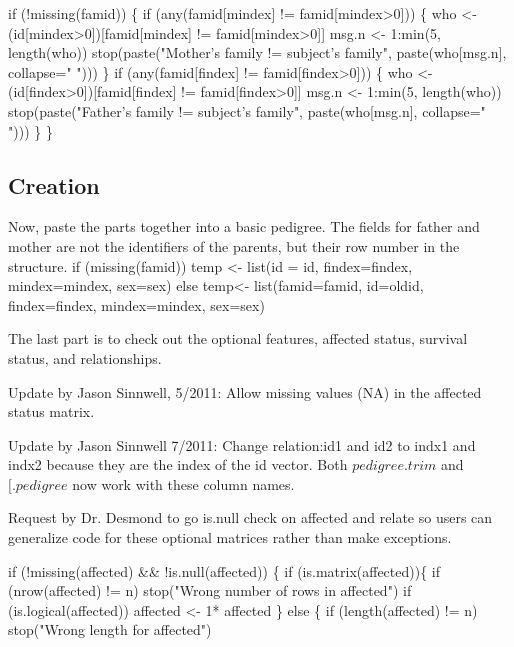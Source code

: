 \documentclass{article}
\begin{document}
if (!missing(famid)) \{
    if (any(famid[mindex] != famid[mindex>0])) \{
        who <- (id[mindex>0])[famid[mindex] != famid[mindex>0]]
        msg.n <- 1:min(5, length(who))
        stop(paste("Mother's family != subject's family", 
                   paste(who[msg.n], collapse=" ")))
        \}
    if (any(famid[findex] != famid[findex>0])) \{
        who <- (id[findex>0])[famid[findex] != famid[findex>0]]
        msg.n <- 1:min(5, length(who))
        stop(paste("Father's family != subject's family", 
                   paste(who[msg.n], collapse=" ")))
        \}
    \}
\nwendcode{}\nwdocspar

\subsection{Creation}
Now, paste the parts together into a basic pedigree.
The fields for father and mother are not the identifiers of
the parents, but their row number in the structure.
\nwenddocs{}\endmoddef
if (missing(famid))
    temp <- list(id = id, findex=findex, mindex=mindex, sex=sex)
else temp<- list(famid=famid, id=oldid, findex=findex, mindex=mindex, 
                 sex=sex)
\nwendcode{}\nwdocspar

The last part is to check out the optional features,
affected status, survival status, and relationships.

Update by Jason Sinnwell, 5/2011: Allow missing values (NA) in the 
affected status matrix. 

Update by Jason Sinnwell 7/2011: Change relation:id1 and id2 to indx1 and indx2
because they are the index of the id vector. Both $pedigree.trim$ 
and $[.pedigree$ now work with these column names.

Request by Dr. Desmond to go is.null check on affected and relate so users
can generalize code for these optional matrices rather than make exceptions.
  
\nwenddocs{}\endmoddef
if (!missing(affected) && !is.null(affected)) \{
    if (is.matrix(affected))\{
        if (nrow(affected) != n) stop("Wrong number of rows in affected")
        if (is.logical(affected)) affected <- 1* affected
        \} 
    else \{
        if (length(affected) != n)
            stop("Wrong length for affected")
\end{document}
